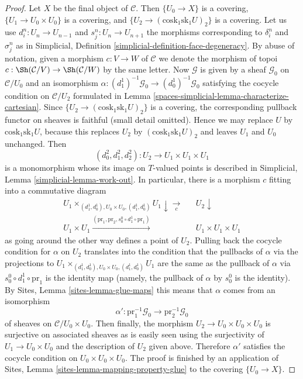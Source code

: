 \begin{proof}
\medskip\noindent
Let $X$ be the final object of $\mathcal{C}$.
Then $\{U_0 \to X\}$ is a covering,
$\{U_1 \to U_0 \times U_0\}$ is a covering, and
$\{U_2 \to (\text{cosk}_1 \text{sk}_1 U)_2\}$ is a covering.
Let us use $d^n_i : U_n \to U_{n - 1}$ and
$s^n_j : U_n \to U_{n + 1}$ the morphisms corresponding
to $\delta^n_i$ and $\sigma^n_j$ as in
Simplicial, Definition \ref{simplicial-definition-face-degeneracy}.
By abuse of notation, given a morphism
$c : V \to W$ of $\mathcal{C}$ we denote the morphism of topoi
$c : \Sh(\mathcal{C}/V) \to \Sh(\mathcal{C}/W)$ by the same letter.
Now $\mathcal{G}$ is given by a sheaf $\mathcal{G}_0$
on $\mathcal{C}/U_0$ and an isomorphism
$\alpha : (d^1_1)^{-1}\mathcal{G}_0 \to (d^1_0)^{-1}\mathcal{G}_0$
satisfying the cocycle condition on $\mathcal{C}/U_2$
formulated in Lemma \ref{spaces-simplicial-lemma-characterize-cartesian}.
Since $\{U_2 \to (\text{cosk}_1 \text{sk}_1 U)_2\}$
is a covering, the corresponding pullback functor
on sheaves is faithful (small detail omitted).
Hence we may replace $U$ by $\text{cosk}_1 \text{sk}_1 U$, because
this replaces $U_2$ by $(\text{cosk}_1 \text{sk}_1 U)_2$ and leaves
$U_1$ and $U_0$ unchanged. Then
$$
(d^2_0, d^2_1, d^2_2) : U_2 \to U_1 \times U_1 \times U_1
$$
is a monomorphism whose its image on $T$-valued points is
described in Simplicial, Lemma \ref{simplicial-lemma-work-out}.
In particular, there is a morphism $c$ fitting into a commutative diagram
$$
\begin{array}{ccc}U_1 \times_{(d^1_1, d^1_0), U_0 \times U_0, (d^1_1, d^1_0)} U_1
\downarrow\underset{c}{\longrightarrow} &  & U_2 \downarrow \\ U_1 \times U_1
\overset{(\text{pr}_1, \text{pr}_2, s^0_0 \circ d^1_1 \circ \text{pr}_1)}{\longrightarrow} &  & U_1 \times U_1 \times U_1\end{array}
$$
as going around the other way defines a point of $U_2$.
Pulling back the cocycle condition for $\alpha$ on $U_2$
translates into the condition that the pullbacks of $\alpha$
via the projections to
$U_1 \times_{(d^1_1, d^1_0), U_0 \times U_0, (d^1_1, d^1_0)} U_1$
are the same as the pullback of $\alpha$ via
$s^0_0 \circ d^1_1 \circ \text{pr}_1$ is the identity map
(namely, the pullback of $\alpha$ by $s^0_0$ is the identity).
By Sites, Lemma \ref{sites-lemma-glue-maps}
this means that $\alpha$ comes from an isomorphism
$$
\alpha' : \text{pr}_1^{-1}\mathcal{G}_0 \to \text{pr}_2^{-1}\mathcal{G}_0
$$
of sheaves on $\mathcal{C}/U_0 \times U_0$.
Then finally, the morphism $U_2 \to U_0 \times U_0 \times U_0$
is surjective on associated sheaves as is easily seen using the
surjectivity of $U_1 \to U_0 \times U_0$
and the description of $U_2$ given above. Therefore $\alpha'$
satisfies the cocycle condition on $U_0 \times U_0 \times U_0$.
The proof is finished by an application of
Sites, Lemma \ref{sites-lemma-mapping-property-glue}
to the covering $\{U_0 \to X\}$.
\end{proof}

